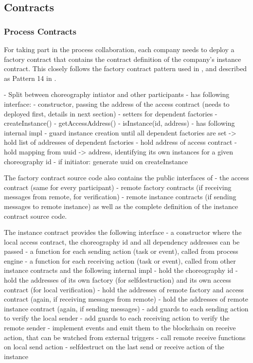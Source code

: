 \documentclass[runningheads]{llncs}
\begin{document}
\subsection{Contracts}

\subsubsection{Process Contracts}

For taking part in the process collaboration, each company needs to deploy a factory contract that contains the contract definition of the company's instance contract.
This closely follows the factory contract pattern used in \cite{weber2016untrusted}, and described as Pattern 14 in \cite{xu2018pattern}.

- Split between choreography intiator and other participants
- has following interface:
- constructor, passing the address of the access contract (needs to deployed first, details in next section)
- setters for dependent factories
- createInstance()
- getAccessAddress()
- isInstance(id, address)
- has following internal impl
- guard instance creation until all dependent factories are set
-> hold list of addresses of dependent factories
- hold address of access contract
- hold mapping from uuid -> address, identifying its own instances for a given choreography id
- if initiator: generate uuid on createInstance

The factory contract source code also contains the public interfaces of
- the access contract (same for every participant)
- remote factory contracts (if receiving messages from remote, for verification)
- remote instance contracts (if sending messages to remote instance)
as well as the complete definition of the instance contract source code.

The instance contract provides the following interface
- a constructor where the local access contract, the choreography id and all dependency addresses can be passed
- a function for each sending action (task or event), called from process engine
- a function for each receiving action (task or event), called from other instance contracts
and the following internal impl
- hold the choreography id
- hold the addresses of its own factory (for selfdestruction) and its own access contract (for local verification)
- hold the addresses of remote factory and access contract (again, if receiving messages from remote)
- hold the addresses of remote instance contract (again, if sending messages)
- add guards to each sending action to verify the local sender
- add guards to each receiving action to verify the remote sender
- implement events and emit them to the blockchain on receive action, that can be watched from external triggers
- call remote receive functions on local send action
- selfdestruct on the last send or receive action of the instance
\end{document}
